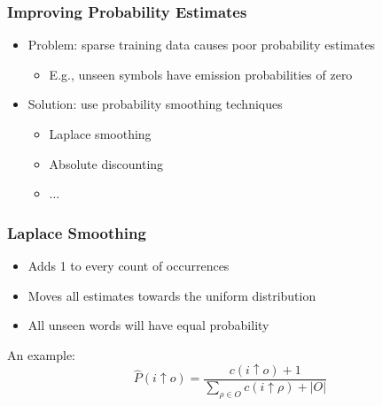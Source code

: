 \documentclass{beamer}
\begin{document}
\begin{frame} \frametitle{Improving Probability Estimates}
  
  \begin{itemize}
  \item Problem: sparse training data causes poor probability estimates
    \begin{itemize}
    \item E.g., unseen symbols have emission probabilities of zero
    \end{itemize}
  \item Solution: use probability smoothing techniques
    \begin{itemize}
    \item Laplace smoothing
    \item Absolute discounting
    \item $\ldots$
    \end{itemize}
  \end{itemize}

\end{frame}


\begin{frame} \frametitle{Laplace Smoothing}
  
  \begin{itemize}
  \item Adds 1 to every count of occurrences
  \item Moves all estimates towards the uniform distribution
  \item All unseen words will have equal probability
  \end{itemize}

  An example:
  \begin{displaymath}
    \hat{P}(i \uparrow o) = \frac{c(i \uparrow o) + 1}{\sum_{\rho \in
        O}c(i \uparrow \rho) + |O|}
  \end{displaymath}

\end{frame}

\end{document}
